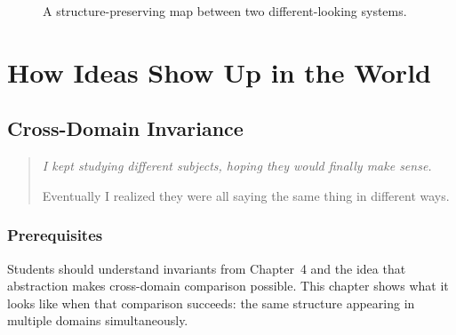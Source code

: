 \documentclass[11pt]{book}
\theoremstyle{definition}
\theoremstyle{remark}
\newenvironment{deepthought}
  {\begin{quote}\itshape}
  {\end{quote}}
\begin{document}
\begin{figure}[h]
\centering
{}
\caption{A structure-preserving map between two different-looking systems.}
\end{figure}

\part{How Ideas Show Up in the World}

\chapter{Cross-Domain Invariance}

\begin{deepthought}
I kept studying different subjects, hoping they would finally make sense.

Eventually I realized they were all saying the same thing in different
ways.
\end{deepthought}

\section*{Prerequisites}

Students should understand invariants from Chapter~4 and the idea that
abstraction makes cross-domain comparison possible. This chapter shows
what it looks like when that comparison succeeds: the same structure
appearing in multiple domains simultaneously.
\end{document}
